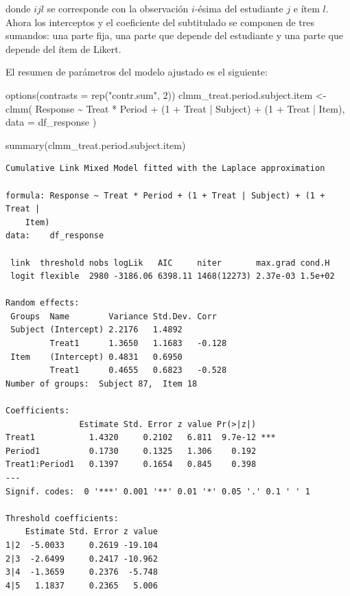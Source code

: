 \documentclass[
  12pt,
  a4paper,
  extrafontsizes,
  onecolumn,
  openright,
  table]{memoir}
\newenvironment{Shaded}{\begin{snugshade}}{\end{snugshade}}
\newcommand{\AttributeTok}[1]{\textcolor[rgb]{0.40,0.45,0.13}{#1}}
\newcommand{\DecValTok}[1]{\textcolor[rgb]{0.68,0.00,0.00}{#1}}
\newcommand{\FunctionTok}[1]{\textcolor[rgb]{0.28,0.35,0.67}{#1}}
\newcommand{\NormalTok}[1]{\textcolor[rgb]{0.00,0.23,0.31}{#1}}
\newcommand{\OtherTok}[1]{\textcolor[rgb]{0.00,0.23,0.31}{#1}}
\newcommand{\SpecialCharTok}[1]{\textcolor[rgb]{0.37,0.37,0.37}{#1}}
\newcommand{\StringTok}[1]{\textcolor[rgb]{0.13,0.47,0.30}{#1}}
\begin{document}
\normalsize

donde \(ijl\) se corresponde con la observación \(i\)-ésima del
estudiante \(j\) e ítem \(l\). Ahora los interceptos y el coeficiente
del subtitulado se componen de tres sumandos: una parte fija, una parte
que depende del estudiante y una parte que depende del ítem de Likert.

El resumen de parámetros del modelo ajustado es el siguiente:

\scriptsize

\begin{Shaded}
\begin{Highlighting}[]
\FunctionTok{options}\NormalTok{(}\AttributeTok{contrasts =} \FunctionTok{rep}\NormalTok{(}\StringTok{"contr.sum"}\NormalTok{, }\DecValTok{2}\NormalTok{))}
\NormalTok{clmm\_treat.period.subject.item }\OtherTok{\textless{}{-}} \FunctionTok{clmm}\NormalTok{(}
\NormalTok{    Response }\SpecialCharTok{\textasciitilde{}}\NormalTok{ Treat }\SpecialCharTok{*}\NormalTok{ Period }\SpecialCharTok{+}\NormalTok{ (}\DecValTok{1} \SpecialCharTok{+}\NormalTok{ Treat }\SpecialCharTok{|}\NormalTok{ Subject) }\SpecialCharTok{+}\NormalTok{ (}\DecValTok{1} \SpecialCharTok{+}\NormalTok{ Treat }\SpecialCharTok{|}\NormalTok{ Item),}
    \AttributeTok{data =}\NormalTok{ df\_response}
\NormalTok{)}

\FunctionTok{summary}\NormalTok{(clmm\_treat.period.subject.item)}
\end{Highlighting}
\end{Shaded}

\begin{verbatim}
Cumulative Link Mixed Model fitted with the Laplace approximation

formula: Response ~ Treat * Period + (1 + Treat | Subject) + (1 + Treat |  
    Item)
data:    df_response

 link  threshold nobs logLik   AIC     niter       max.grad cond.H 
 logit flexible  2980 -3186.06 6398.11 1468(12273) 2.37e-03 1.5e+02

Random effects:
 Groups  Name        Variance Std.Dev. Corr   
 Subject (Intercept) 2.2176   1.4892          
         Treat1      1.3650   1.1683   -0.128 
 Item    (Intercept) 0.4831   0.6950          
         Treat1      0.4655   0.6823   -0.528 
Number of groups:  Subject 87,  Item 18 

Coefficients:
               Estimate Std. Error z value Pr(>|z|)    
Treat1           1.4320     0.2102   6.811  9.7e-12 ***
Period1          0.1730     0.1325   1.306    0.192    
Treat1:Period1   0.1397     0.1654   0.845    0.398    
---
Signif. codes:  0 '***' 0.001 '**' 0.01 '*' 0.05 '.' 0.1 ' ' 1

Threshold coefficients:
    Estimate Std. Error z value
1|2  -5.0033     0.2619 -19.104
2|3  -2.6499     0.2417 -10.962
3|4  -1.3659     0.2376  -5.748
4|5   1.1837     0.2365   5.006
\end{verbatim}
\end{document}
